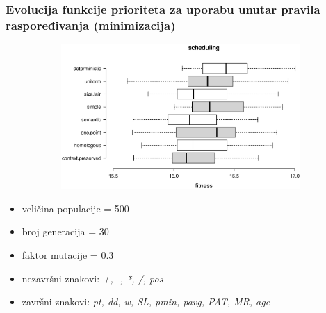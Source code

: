 \documentclass{beamer}
\begin{document}
\begin{frame}
\frametitle{Evolucija funkcije prioriteta za uporabu unutar pravila raspoređivanja (minimizacija)}

\begin{figure}[!htb]
\begin{figure}[H]
	\centering
	\includegraphics[trim=3.5cm 5.5cm 0cm 3.5cm, scale=0.3]{./boxPlots/iprojekt.eps}
\end{figure}

\endminipage
{}
\endminipage
\end{figure}

\begin{itemize}
\item{veličina populacije = 500}
\item{broj generacija = 30}
\item{faktor mutacije = 0.3}
\item{nezavršni znakovi: \textit{+, -, *, /, pos}}
\item{završni znakovi: \textit{pt, dd, w, SL, pmin, pavg, PAT, MR, age}}
\end{itemize}
\end{frame}
\end{document}
